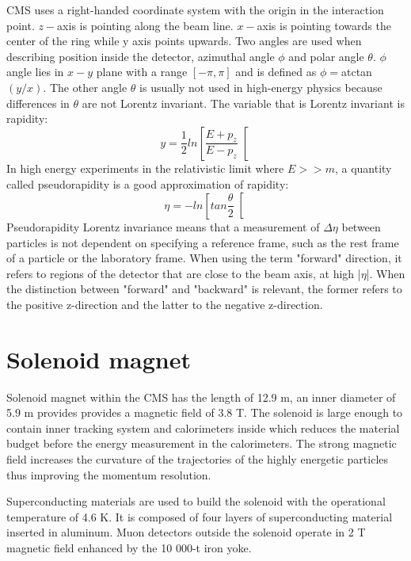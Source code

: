 CMS uses a right-handed coordinate system with the origin in the interaction point. $z-$axis is pointing along the beam line. $x-$axis is pointing towards the center of the ring while y axis points upwards. Two angles are used when describing position inside the detector, azimuthal angle $\phi$ and polar angle $\theta$. $\phi$ angle lies in $x-y$ plane with a range $[-\pi,\pi]$  and is defined as $\phi=$atctan$(y/x)$. The other angle $\theta$ is usually not used in high-energy physics because differences in $\theta$ are not Lorentz invariant.
The variable that is Lorentz invariant is rapidity:
\begin{equation}
y=\frac{1}{2}ln\left[ \frac{E+p_z}{E-p_z}\right[
\end{equation}
In high energy experiments in the relativistic limit where $E>>m$, a quantity called pseudorapidity is a good approximation of rapidity:
\begin{equation}
\eta = -ln \left[ tan \frac{\theta}{2} \right[
\end{equation}
Pseudorapidity Lorentz invariance means that a measurement of $\Delta\eta$ between particles is not dependent on specifying a reference frame, such as the rest frame of a particle or the laboratory frame. When using the term "forward" direction, it refers to regions of the detector that are close to the beam axis, at high |$\eta$|. When the distinction between "forward" and "backward" is relevant, the former refers to the positive z-direction and the latter to the negative z-direction.


\section{Solenoid magnet}

Solenoid magnet within the CMS has the length of 12.9 m, an inner diameter of 5.9 m provides provides a magnetic field of 3.8 T. The solenoid is large enough to contain inner tracking system and calorimeters inside which reduces the material budget before the energy measurement in the calorimeters. The strong magnetic field increases the curvature of the trajectories of the highly energetic particles thus improving the momentum resolution.
\par Superconducting materials are used to build the solenoid with the operational temperature of 4.6 K. It is composed of four layers of superconducting material inserted in aluminum. Muon detectors outside the solenoid operate in 2 T magnetic field enhanced by the 10 000-t iron yoke.  

